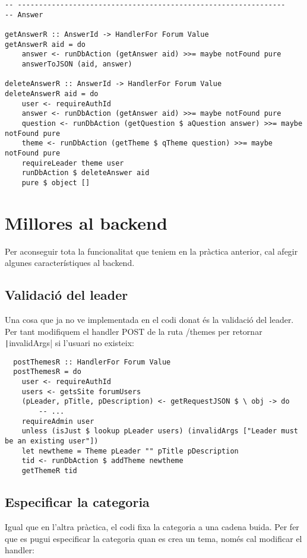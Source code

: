 \documentclass[catalan, a4paper]{scrartcl}
\begin{document}
\begin{verbatim}
-- ---------------------------------------------------------------
-- Answer

getAnswerR :: AnswerId -> HandlerFor Forum Value
getAnswerR aid = do
    answer <- runDbAction (getAnswer aid) >>= maybe notFound pure
    answerToJSON (aid, answer)

deleteAnswerR :: AnswerId -> HandlerFor Forum Value
deleteAnswerR aid = do
    user <- requireAuthId
    answer <- runDbAction (getAnswer aid) >>= maybe notFound pure
    question <- runDbAction (getQuestion $ aQuestion answer) >>= maybe notFound pure
    theme <- runDbAction (getTheme $ qTheme question) >>= maybe notFound pure
    requireLeader theme user
    runDbAction $ deleteAnswer aid
    pure $ object []
\end{verbatim}


\section{Millores al backend}

Per aconseguir tota la funcionalitat que teniem en la pràctica anterior,
cal afegir algunes característiques al backend.

\subsection*{Validació del leader}

Una cosa que ja no ve implementada en el codi donat és la validació
del leader. Per tant modifiquem el handler \textsf{POST} de la ruta
\textsf{/themes} per retornar \texttt|invalidArgs| si
l'usuari no existeix:

\begin{verbatim}
  postThemesR :: HandlerFor Forum Value
  postThemesR = do
    user <- requireAuthId
    users <- getsSite forumUsers
    (pLeader, pTitle, pDescription) <- getRequestJSON $ \ obj -> do
        -- ...
    requireAdmin user
    unless (isJust $ lookup pLeader users) (invalidArgs ["Leader must be an existing user"])
    let newtheme = Theme pLeader "" pTitle pDescription
    tid <- runDbAction $ addTheme newtheme
    getThemeR tid
\end{verbatim}

\subsection*{Especificar la categoria}

Igual que en l'altra pràctica, el codi fixa la categoria a una cadena buida.
Per fer que es pugui especificar la categoria quan es crea un tema, només cal
modificar el handler:
\end{document}
